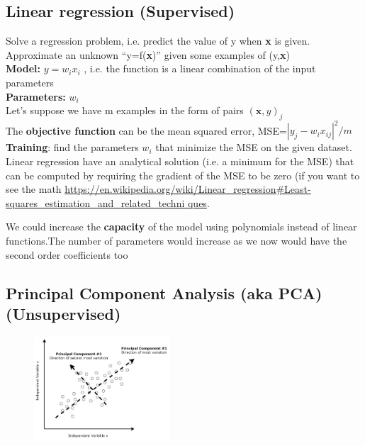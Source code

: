 \subsection{Linear regression (Supervised)}

Solve a regression problem, i.e. predict the value of y when \textbf{x} is given. Approximate an unknown “y=f(\textbf{x})” given some examples of (y,\textbf{x})\\

\textbf{Model:} $y=w_ix_i$ , i.e. the function is a linear combination of the input parameters\\

\textbf{Parameters:} $ w_i$\\

Let’s suppose we have m examples in the form of pairs $(\textbf{x},y)_j$\\

The \textbf{objective function} can be the mean squared error, MSE=$|y_j - w_i x_{ij} |^2/m$\\

\textbf{Training}: find the parameters $w_i$ that minimize the MSE on the given dataset. Linear regression have an analytical solution (i.e. a minimum for the MSE) that can be computed by requiring the gradient of the MSE to be zero (if you want to see the math \url{https://en.wikipedia.org/wiki/Linear_regression#Least-squares_estimation_and_related_techni
ques}.

We could increase the \textbf{capacity} of the model using polynomials instead of linear functions.The number of parameters would increase as we now would have the second order
coefficients too
\subsection{Principal Component Analysis (aka PCA) (Unsupervised)}

\begin{figure}
	\includegraphics[width=0.45\textwidth]{figure_ml/pca.png}
\end{figure} 


